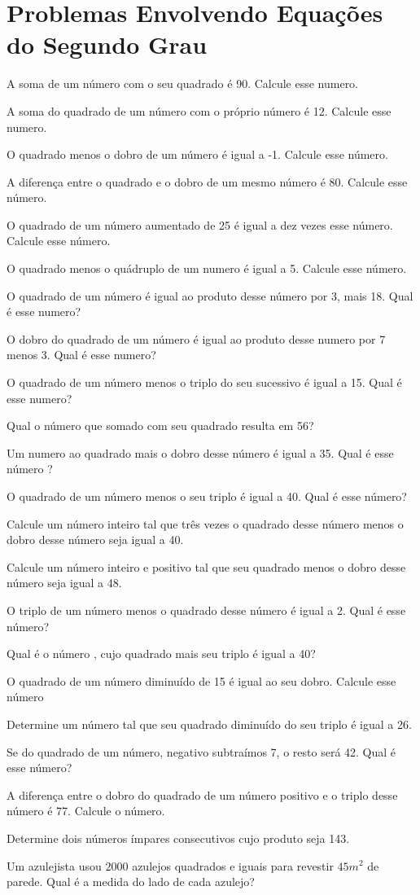 	\section{Problemas Envolvendo Equações do Segundo Grau}
	
	\item A soma de um número com o seu quadrado é 90. Calcule esse numero.
	\item A soma do quadrado de um número com o próprio número é 12. Calcule esse numero.
	\item O quadrado menos o dobro de um número é igual a -1. Calcule esse número.
	\item A diferença entre o quadrado e o dobro de um mesmo número é 80. Calcule esse número.
	\item O quadrado de um número aumentado de 25 é igual a dez vezes esse número.         Calcule esse número.
	\item O quadrado menos o quádruplo de um numero é igual a 5. Calcule esse número.
	\item O quadrado de um número é igual ao produto desse número por 3, mais 18. Qual é esse numero?
	\item O dobro do quadrado de um número é igual ao produto desse numero por 7 menos 3. Qual é esse numero?
	\item O quadrado de um número menos o triplo do seu sucessivo é igual a 15. Qual é esse numero?
	\item Qual o número que somado com seu quadrado resulta em 56?
	\item Um numero ao quadrado mais o dobro desse número é igual a 35. Qual é esse número ?
	\item O quadrado de um número menos o seu triplo é igual a 40. Qual é esse número?
	\item Calcule um número inteiro tal que três vezes o quadrado desse número menos o dobro desse número seja igual a 40.
	\item Calcule um número inteiro e positivo tal que seu quadrado menos o dobro desse número seja igual a 48.
	\item O triplo de um número menos o quadrado desse número é igual a 2. Qual é esse número?
	\item Qual é o número , cujo quadrado mais seu triplo é igual a 40?
	\item O quadrado de um número diminuído de 15 é igual ao seu dobro. Calcule esse número
	\item Determine um número tal que seu quadrado diminuído do seu triplo é igual a 26.
	\item Se do quadrado de um número, negativo subtraímos 7, o resto será 42. Qual é esse número?
	\item A diferença entre o dobro do quadrado de um número positivo e o triplo desse número é 77. Calcule o número.
	\item Determine dois números ímpares consecutivos cujo produto seja 143.
	\item Um azulejista usou $2000$ azulejos quadrados e iguais para revestir $45m^2$ de parede. Qual é a medida do lado de cada azulejo?
	